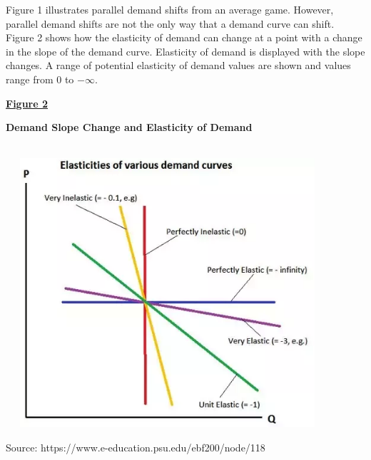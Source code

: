 \documentclass[preprint,12pt,times]{elsarticle}
\begin{document}
Figure 1 illustrates parallel demand shifts from an average game.  However, parallel demand shifts are not the only way that a demand curve can shift.  Figure 2 shows how the elasticity of demand can change at a point with a change in the slope of the demand curve.  Elasticity of demand is displayed with the slope changes.  A range of potential elasticity of demand values are shown and values range from 0 to $-\infty$.\\

\begin{large}
\ul{\textbf{Figure 2}}
\end{large}
\begin{flushleft}
\begin{large}
{\textbf{Demand Slope Change and Elasticity of Demand}}
\end{large}
\end{flushleft}\\

\includegraphics [width=12cm, height=10cm]{Picture19.png}
\begin{flushleft}
\begin{footnotesize}
{Source: https://www.e-education.psu.edu/ebf200/node/118}
\end{footnotesize}
\end{flushleft}
\end{document}
